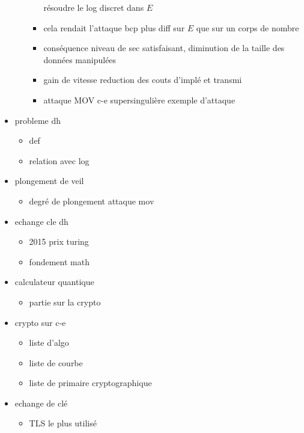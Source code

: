 \begin{itemize}
\begin{itemize}
\begin{itemize}
                        résoudre le log discret dans $E$
                    \item cela rendait l'attaque bcp plus diff sur $E$ que sur un corps de
                        nombre
                    \item conséquence niveau de sec satisfaisant, diminution de la
                        taille des données manipulées
                    \item gain de vitesse reduction des couts d'implé et transmi
                    \item attaque MOV c-e supersingulière exemple d'attaque
                \end{itemize}
        \end{itemize}
    \item probleme dh
        \begin{itemize}
            \item def
            \item relation avec log
        \end{itemize}
    \item plongement de veil
        \begin{itemize}
            \item degré de plongement attaque mov
        \end{itemize}
    \item echange cle dh
        \begin{itemize}
            \item 2015 prix turing
            \item fondement math
        \end{itemize}
    \item calculateur quantique
        \begin{itemize}
            \item partie sur la crypto
        \end{itemize}
    \item crypto sur c-e
        \begin{itemize}
            \item liste d'algo
            \item liste de courbe
            \item liste de primaire cryptographique
        \end{itemize}
    \item echange de clé
        \begin{itemize}
            \item TLS le plus utilisé

\end{itemize}
\end{itemize}
